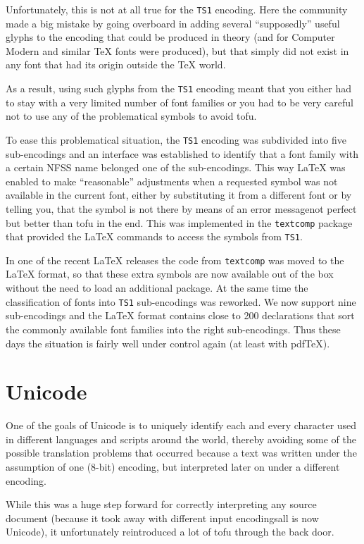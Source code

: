 \documentclass{ltugboat}
\newcommand\pdfTeX{pdf\TeX}
\providecommand\pkg[1]{\texttt{#1}}
\begin{document}
Unfortunately, this is not at all true for the \texttt{TS1}
encoding. Here the community made a big mistake by going overboard in
adding several \enquote{supposedly} useful glyphs to the encoding that could
be produced in theory (and for Computer Modern and similar \TeX{}
fonts were produced), but that simply did not exist in any font that
had its origin outside the \TeX{} world.

As a result, using such glyphs from the \texttt{TS1} encoding meant
that you either had to stay with a very limited number of font
families or you had to be very careful not to use any of the
problematical symbols to avoid tofu.

To ease this problematical situation, the \texttt{TS1} encoding was
subdivided into five sub-encodings and an interface was established to
identify that a font family with a certain NFSS name belonged one of
the sub-encodings. This way \LaTeX{} was enabled to make
\enquote{reasonable} adjustments when a requested symbol was not
available in the current font, either by substituting it from a
different font or by telling you, that the symbol is not there by
means of an error message\Dash not perfect but better than tofu in the
end. This was implemented in the \pkg{textcomp} package that provided
the \LaTeX{} commands to access the symbols from \texttt{TS1}.

In one of the recent \LaTeX{} releases the code from \pkg{textcomp}
was moved to the \LaTeX{} format, so that these extra symbols are now
available out of the box without the need to load an additional
package. At the same time the classification of fonts into
\texttt{TS1} sub-encodings was reworked. We now support nine
sub-encodings and the \LaTeX{} format contains close to 200
declarations that sort the commonly available font families into the
right sub-encodings. Thus these days the situation is fairly well under
control again (at least with \pdfTeX).

\section{Unicode}

One of the goals of Unicode is to uniquely identify each and every
character used in different languages and scripts around the world,
thereby avoiding some of the possible translation problems that
occurred because a text was written under the assumption of one
(8-bit) encoding, but interpreted later on under a different encoding.

While this was a huge step forward for correctly interpreting any
source document (because it took away with different input
encodings\Dash all is now Unicode), it unfortunately reintroduced a lot
of tofu through the back door.
\end{document}
